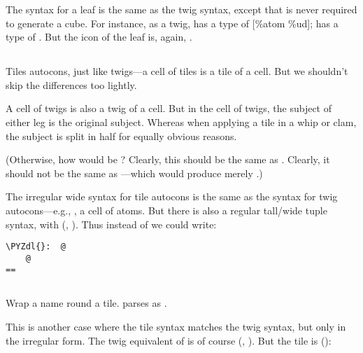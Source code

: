 The syntax for a leaf is the same as the twig syntax, except that
\kode{\%} is never required to generate a cube.  For instance, as a
twig,  has a type of [\%atom \%ud];  has a type of 
\kode{[\%cube 7 [\%atom \%ud]]}.  But the icon of the leaf  is,
again, \kode{[\%cube 7 [\%atom \%ud]]}.

\subsection{\kode{[p=tile q=tile]}}

Tiles autocons, just like twigs---a cell of tiles is a tile of
a cell.  But we shouldn't skip the differences too lightly.

A cell of twigs is also a twig of a cell.  But in the cell of
twigs, the subject of either leg is the original subject.
Whereas when applying a tile in a whip or clam, the subject is
split in half for equally obvious reasons.  

(Otherwise, how would \kode{(,[@ @] [4 5])} be \kode{[4 5]}?  Clearly, this
should be the same as \kode{[(,@ 4) (,@ 5)]}.  Clearly, it should not
be the same as \kode{[(,@ [4 5]) (,@ [4 5])]}---which would produce
merely \kode{[0 0]}.)

The irregular wide syntax for tile autocons is the same as the
syntax for twig autocons---e.g., \kode{[@ @]}, a cell of atoms.  But
there is also a regular tall/wide tuple syntax, with \kode{\$:}
(, ).  Thus instead of \kode{[@ @]} we could write:

\begin{framed_shaded}
\begin{Verbatim}[fontsize=\relsize{-2.5},fontseries=b,commandchars=\\\{\}]
\PYZdl{}:  @
    @
==
\end{Verbatim}
\end{framed_shaded}

\subsection{\kode{[\%bark p=term q=tile]}}

Wrap a name round a tile.   parses as .

This is another case where the tile syntax matches the twig
syntax, but only in the irregular form.  The twig equivalent of
 is of course \kode{\ket =} (, ).  But the tile is
\kode{\$=} ():

